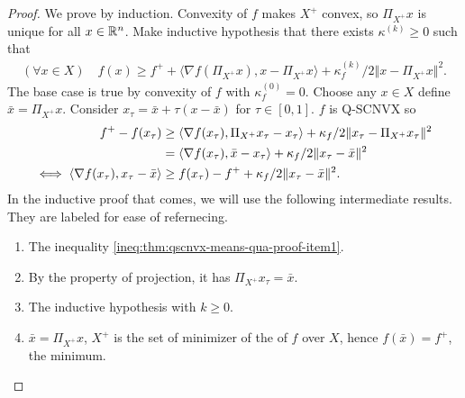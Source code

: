 \documentclass[12pt]{report}
\begin{document}
            \begin{proof}
                We prove by induction. 
                Convexity of $f$ makes $X^+$ convex, so $\Pi_{X^+}x$ is unique for all $x \in \mathbb R^n$. 
                Make inductive hypothesis that there exists $\kappa^{(k)} \ge 0$ such that 
                \begin{align*}
                    (\forall x \in X)\quad
                    f(x) \ge f^+ + \langle \nabla f(\Pi_{X^+}x), x - \Pi_{X^+}x\rangle 
                    + \kappa^{(k)}_f/2\Vert x - \Pi_{X^+}x \Vert^2. 
                \end{align*}
                The base case is true by convexity of $f$ with $\kappa_f^{(0)} = 0$. 
                Choose any $x \in X$ define $\bar x = \Pi_{X^+}x$. 
                Consider $x_\tau = \bar x + \tau(x - \bar x)$ for $\tau \in [0, 1]$. 
                $f$ is Q-SCNVX so
                \begin{align}\label{ineq:thm:qscnvx-means-qua-proof-item1}
                    f^+ - f(x_\tau) &\ge \langle \nabla f(x_\tau), \Pi_{X^+}x_\tau - x_\tau\rangle + 
                    \kappa_f/2 \Vert x_\tau - \Pi_{X^+}x_\tau\Vert^2 
                    \notag\\
                    &= 
                    \langle \nabla f(x_\tau), \bar x - x_\tau\rangle + 
                    \kappa_f/2 \Vert x_\tau - \bar x\Vert^2
                    \notag\\
                    \iff 
                    \langle \nabla f(x_\tau), x_\tau - \bar x\rangle
                    &\ge f(x_\tau) - f^+ + \kappa_f/2\Vert x_\tau -\bar x\Vert^2. 
                \end{align}
                In the inductive proof that comes, we will use the following intermediate results. 
                They are labeled for ease of refernecing. 
                \begin{enumerate}
                    \item The inequality \eqref{ineq:thm:qscnvx-means-qua-proof-item1}. 
                    \item By the property of projection, it has $\Pi_{X^+} x_\tau = \bar x$. 
                    \item The inductive hypothesis with $k \ge 0$. 
                    \item $\bar x = \Pi_{X^+}x$, $X^+$ is the set of minimizer of the of $f$ over $X$, hence $f(\bar x) = f^+$, the minimum. 
                \end{enumerate}

\end{proof}
\end{document}
